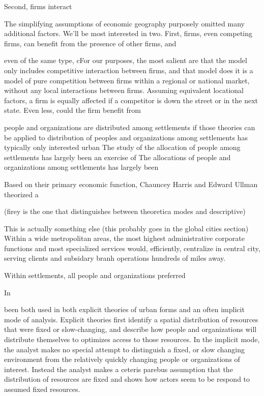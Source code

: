 Second, firms interact 



The simplifying assumptions of economic geography purposely omitted
many additional factors. We'll be most interested in two. First, firms,
even competing firms, can benefit from the presence of other firms,
and  


even of the same type, cFor our purposes, the most salient are that
the model only includes competitive interaction between firms, and
that model does 
it is a model of pure competition between firms within a regional or
national market, without any local interactions between
firms. Assuming equivalent locational factors, a firm is equally
affected if a competitor is down the street or in the next state. Even
less, could the firm benefit from 




people and organizations are distributed among settlements if
those theories can be applied to 
distribution of peoples and organizations among settlements has
typically only interested urban 
The study of the allocation of people among settlements has largely
been an exercise of 
The allocations of people and organizations among settlements has
largely been


Based on their primary economic function, Chauncey Harris and Edward
Ullman theorized a


(firey is the one that distinguishes between theoretica modes and
descriptive)



This is actually something else (this probably goes in the global
cities section)
Within a wide
metropolitan areas, the most highest administrative corporate
functions and most specialized services would, efficiently, centralize
in central city, serving clients and subsidary branh operations
hundreds of miles away.







Within settlements, all people and organizations
preferred 



In 



 been both used in both explicit theories of
urban forms and an often implicit mode of analysis. Explicit theories
first identify a spatial distribution of resources that were fixed or
slow-changing, and describe how people and organizations will
distribute themselves to optimizes access to those resources. In the
implicit mode, the analyst makes no special attempt to distinguish a
fixed, or slow changing environment from the relatively quickly
changing people or organizations of interest. Instead the analyst
makes a ceteris parebus assumption that the distribution of resources
are fixed and shows how actors seem to be respond to assumed fixed resources.



